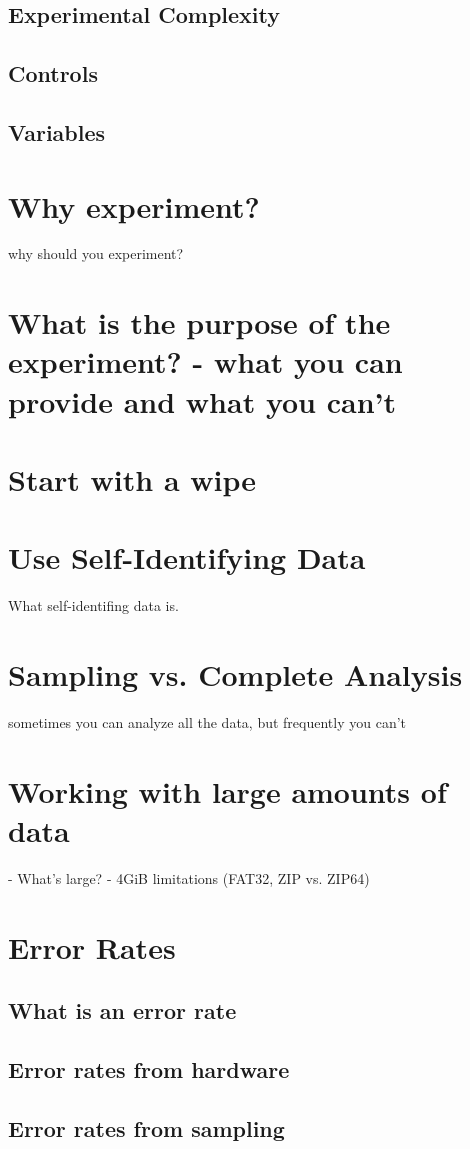 \subsection{Experimental Complexity}

\subsection{Controls}

\subsection{Variables}

\section{Why experiment?}

why should you experiment?

\section{What is the purpose of the experiment? - what you can provide and what you can't}
\section{Start with a wipe}
\section{Use Self-Identifying Data}

What self-identifing data is.



\section{Sampling vs. Complete Analysis}

sometimes you can analyze all the data, but frequently you can't

\section{Working with large amounts of data}
 - What's large?
 - 4GiB limitations (FAT32, ZIP vs. ZIP64)
\section{Error Rates}
\subsection{What is an error rate}
\subsection{Error rates from hardware}
\subsection{Error rates from sampling}

